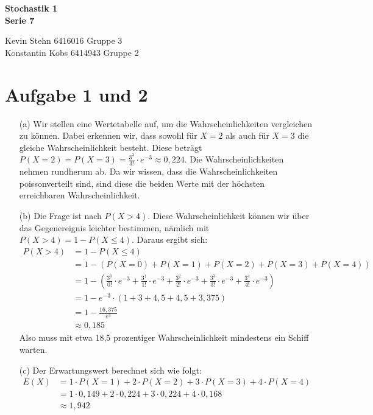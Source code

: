 \documentclass[10pt,a4paper]{article}
\begin{document}
\begin{center}
\textbf{Stochastik 1 \\ Serie 7 \\}
\end{center}

\begin{flushright}
Kevin Stehn 6416016 Gruppe 3 \\
Konstantin Kobs 6414943 Gruppe 2
\end{flushright}

\section*{Aufgabe 1 und 2}
\begin{itemize}
\item[(a)] Wir stellen eine Wertetabelle auf, um die Wahrscheinlichkeiten vergleichen zu können. Dabei erkennen wir, dass sowohl für $X = 2$ als auch für $X = 3$ die gleiche Wahrscheinlichkeit besteht. Diese beträgt $P(X = 2) = P(X = 3) = \frac{3^3}{3!}\cdot e^{-3} \approx 0,224$. Die Wahrscheinlichkeiten nehmen rundherum ab. Da wir wissen, dass die Wahrscheinlichkeiten poissonverteilt sind, sind diese die beiden Werte mit der höchsten erreichbaren Wahrscheinlichkeit.

\item[(b)] Die Frage ist nach $P(X > 4)$. Diese Wahrscheinlichkeit können wir über das Gegenereignis leichter bestimmen, nämlich mit $P(X > 4) = 1 - P(X \leq 4)$. Daraus ergibt sich:
\begin{align*}
P(X > 4) &= 1 - P(X \leq 4)\\
&= 1 - (P(X = 0) + P(X = 1) + P(X = 2) + P(X = 3) + P(X = 4))\\
&= 1- \left(\frac{3^0}{0!}\cdot e^{-3} + \frac{3^1}{1!}\cdot e^{-3} + \frac{3^2}{2!}\cdot e^{-3} +\frac{3^3}{3!}\cdot e^{-3} + \frac{3^4}{4!}\cdot e^{-3}\right)\\
&= 1 - e^{-3} \cdot (1 + 3 + 4,5 + 4,5 + 3,375)\\
&= 1 - \frac{16,375}{e^3}\\
&\approx 0,185
\end{align*}
Also muss mit etwa 18,5 prozentiger Wahrscheinlichkeit mindestens ein Schiff warten.

\item[(c)] Der Erwartungswert berechnet sich wie folgt:
\begin{align*}
E(X) &= 1 \cdot P(X = 1)+ 2 \cdot P(X = 2) + 3 \cdot P(X = 3) + 4 \cdot P(X = 4)\\
&= 1 \cdot 0,149 + 2 \cdot 0,224 + 3 \cdot 0,224 + 4 \cdot 0,168\\
&\approx 1,942
\end{align*}
\end{itemize}
\end{document}
